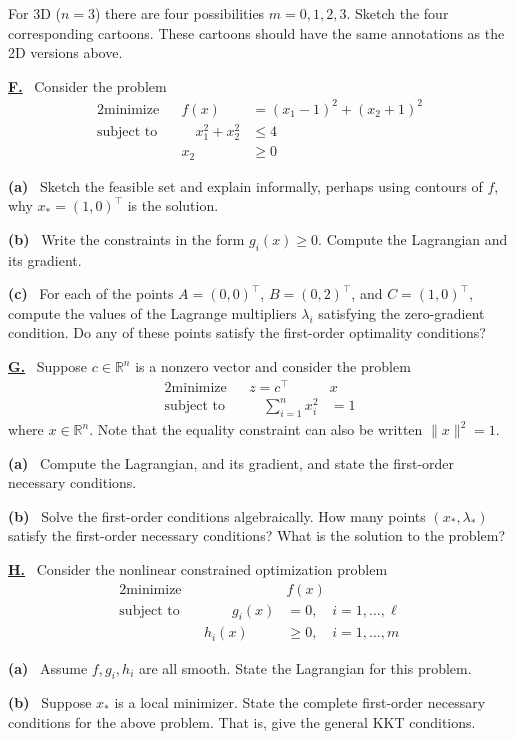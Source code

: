 \documentclass[11pt]{amsart}
\newcommand{\RR}{{\mathbb{R}}}
\newcommand{\prob}[1]{\bigskip\noindent\large\textbf{\underline{#1.}} \, \normalsize}
\newcommand{\epart}[1]{\medskip\noindent \textbf{(#1)} \,}
\begin{document}
\bigskip
\noindent For 3D ($n=3$) there are four possibilities $m=0,1,2,3$.  Sketch the four corresponding cartoons.  These cartoons should have the same annotations as the 2D versions above.


\prob{F}  Consider the problem
\begin{alignat*}{2}
    \text{minimize}   &&  f(x) &= (x_1-1)^2 + (x_2+1)^2 \\
    \text{subject to} && \quad x_1^2 + x_2^2 &\le 4 \\
                      &&        x_2 &\ge 0
\end{alignat*}

\epart{a}  Sketch the feasible set and explain informally, perhaps using contours of $f$, why $x_*=(1,0)^\top$ is the solution.

\epart{b}  Write the constraints in the form $g_i(x)\ge 0$.  Compute the Lagrangian and its gradient.

\epart{c}  For each of the points $A = (0,0)^\top$, $B=(0,2)^\top$, and $C=(1,0)^\top$, compute the values of the Lagrange multipliers $\lambda_i$ satisfying the zero-gradient condition.  Do any of these points satisfy the first-order optimality conditions?


\prob{G}  Suppose $c\in\RR^n$ is a nonzero vector and consider the problem
\begin{alignat*}{2}
    \text{minimize}   &&  z = c^\top &x \\
    \text{subject to} && \quad \sum_{i=1}^n x_i^2 &= 1
\end{alignat*}
where $x\in\RR^n$.  Note that the equality constraint can also be written $\|x\|^2=1$.

\epart{a}  Compute the Lagrangian, and its gradient, and state the first-order necessary conditions.

\epart{b}  Solve the first-order conditions algebraically.  How many points $(x_*,\lambda_*)$ satisfy the first-order necessary conditions?  What is the solution to the problem?


\prob{H}  Consider the nonlinear constrained optimization problem
\begin{alignat*}{2}
    \text{minimize}   &&  &f(x) \\
    \text{subject to} && \qquad g_i(x) &= 0, \quad i=1,\dots,\ell \\
                      &&       h_i(x) &\ge 0, \quad i=1,\dots,m
\end{alignat*}

\epart{a}  Assume $f,g_i,h_i$ are all smooth.  State the Lagrangian for this problem.

\epart{b}  Suppose $x_*$ is a local minimizer.  State the complete first-order necessary conditions for the above problem.  That is, give the general KKT conditions.
\end{document}
